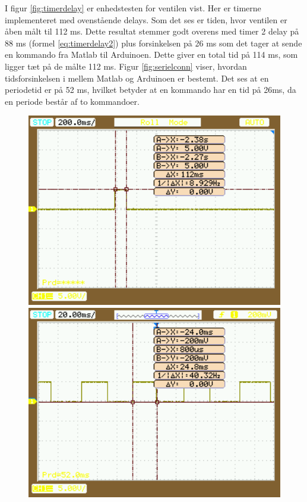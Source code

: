 I figur \ref{fig:timerdelay} er enhedstesten for ventilen vist. Her er timerne implementeret med ovenstående delays. Som det ses er tiden, hvor ventilen er åben målt til 112 ms. Dette resultat stemmer godt overens med timer 2 delay på 88 ms (formel \ref{eq:timerdelay2}) plus forsinkelsen på 26 ms som det tager at sende en kommando fra Matlab til Arduinoen. Dette giver en total tid på 114 ms, som ligger tæt på de målte 112 ms. Figur \ref{fig:serielconn} viser, hvordan tidsforsinkelsen i mellem Matlab og Arduinoen er bestemt. Det ses at en periodetid er på 52 ms, hvilket betyder at en kommando har en tid på 26ms, da en periode består af to kommandoer.

 \begin{figure}[H] \centering
\begin{minipage}[b]{0.48\textwidth} \centering
\includegraphics[width=1.00\textwidth]{billeder/timerdelay.png} %
\end{minipage} \hfill
\begin{minipage}[b]{0.48\textwidth} \centering
\includegraphics[width=1.00\textwidth]{billeder/serialconn.png} %

\end{minipage}
\end{figure}
